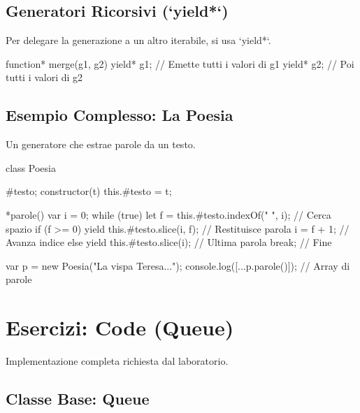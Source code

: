 \subsection{Generatori Ricorsivi (`yield*`)}
Per delegare la generazione a un altro iterabile, si usa `yield*`.
\begin{jsbox}
function* merge(g1, g2) {
    yield* g1; // Emette tutti i valori di g1
    yield* g2; // Poi tutti i valori di g2
}
\end{jsbox}

\subsection{Esempio Complesso: La Poesia}
Un generatore che estrae parole da un testo.
\begin{jsbox}
class Poesia {
    #testo;
    constructor(t) { this.#testo = t; }

    *parole() {
        var i = 0;
        while (true) {
            let f = this.#testo.indexOf(" ", i); // Cerca spazio
            if (f >= 0) {
                yield this.#testo.slice(i, f); // Restituisce parola
                i = f + 1; // Avanza indice
            } else {
                yield this.#testo.slice(i); // Ultima parola
                break; // Fine
            }
        }
    }
}
var p = new Poesia("La vispa Teresa...");
console.log([...p.parole()]); // Array di parole
\end{jsbox}

\section{Esercizi: Code (Queue)}
Implementazione completa richiesta dal laboratorio.

\subsection{Classe Base: Queue}

